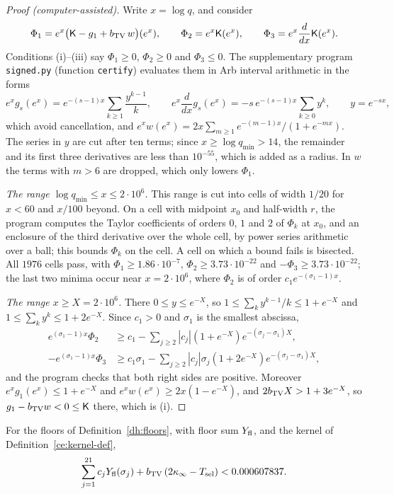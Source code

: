 \begin{proof}[Proof (computer-assisted)]
Write $x=\log q$, and consider
\[
 \Phi_1=e^x\bigl(\mathsf K-g_1+b_{\rm TV}\,w\bigr)(e^x),\qquad
 \Phi_2=e^x\mathsf K(e^x),\qquad
 \Phi_3=e^x\frac{d}{dx}\mathsf K(e^x).
\]
Conditions (i)--(iii) say $\Phi_1\ge0$, $\Phi_2\ge0$ and $\Phi_3\le0$. The
supplementary program \texttt{signed.py} (function \texttt{certify})
evaluates them in Arb interval arithmetic in the forms
\[
 e^xg_s(e^x)=e^{-(s-1)x}\sum_{k\ge1}\frac{y^{k-1}}k,\qquad
 e^x\frac{d}{dx}g_s(e^x)=-s\,e^{-(s-1)x}\sum_{k\ge0}y^k,\qquad y=e^{-sx},
\]
which avoid cancellation, and
$e^xw(e^x)=2x\sum_{m\ge1}e^{-(m-1)x}/(1+e^{-mx})$. The series in $y$ are cut
after ten terms; since $x\ge\log q_{\min}>14$, the remainder and its first
three derivatives are less than $10^{-55}$, which is added as a radius. In
$w$ the terms with $m>6$ are dropped, which only lowers $\Phi_1$.

\emph{The range $\log q_{\min}\le x\le2\cdot10^6$.} This range is cut into
cells of width $1/20$ for $x<60$ and $x/100$ beyond. On a cell with midpoint
$x_0$ and half-width $r$, the program computes the Taylor coefficients of
orders $0$, $1$ and $2$ of $\Phi_k$ at $x_0$, and an enclosure of the third
derivative over the whole cell, by power series arithmetic over a ball; this
bounds $\Phi_k$ on the cell. A cell on which a bound fails is bisected. All
$1976$ cells pass, with $\Phi_1\ge1.86\cdot10^{-7}$,
$\Phi_2\ge3.73\cdot10^{-22}$ and $-\Phi_3\ge3.73\cdot10^{-22}$; the last two
minima occur near $x=2\cdot10^6$, where $\Phi_2$ is of order
$c_1e^{-(\sigma_1-1)x}$.

\emph{The range $x\ge X=2\cdot10^6$.} There $0\le y\le e^{-X}$, so
$1\le\sum_ky^{k-1}/k\le1+e^{-X}$ and $1\le\sum_ky^k\le1+2e^{-X}$. Since
$c_1>0$ and $\sigma_1$ is the smallest abscissa,
\begin{align*}
 e^{(\sigma_1-1)x}\Phi_2&\ge c_1-\sum_{j\ge2}|c_j|(1+e^{-X})e^{-(\sigma_j-\sigma_1)X},\\
 -e^{(\sigma_1-1)x}\Phi_3&\ge c_1\sigma_1-\sum_{j\ge2}|c_j|\sigma_j(1+2e^{-X})
 e^{-(\sigma_j-\sigma_1)X},
\end{align*}
and the program checks that both right sides are positive. Moreover
$e^xg_1(e^x)\le1+e^{-X}$ and $e^xw(e^x)\ge2x(1-e^{-X})$, and
$2b_{\rm TV}X>1+3e^{-X}$, so $g_1-b_{\rm TV}w<0\le\mathsf K$ there, which is
(i).
\end{proof}

\begin{lemma}\label{ce:values}
For the floors of Definition~\ref{dh:floors}, with floor sum $Y_{\rm fl}$,
and the kernel of Definition~\ref{ce:kernel-def},
\[
 \sum_{j=1}^{21}c_jY_{\rm fl}(\sigma_j)+b_{\rm TV}\,(2\kappa_\infty-T_{\rm sel})
 <0.000607837.
\]
\end{lemma}

